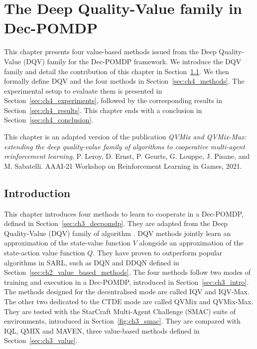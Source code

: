 \chapter{The Deep Quality-Value family in Dec-POMDP}\label{ch:qvmix}
\begin{chapter_outline}

This chapter presents four value-based methods issued from the Deep Quality-Value (DQV) family for the Dec-POMDP framework.
We introduce the DQV family and detail the contribution of this chapter in Section~\ref{sec:ch4_intro}.
We then formally define DQV and the four methods in Section~\ref{sec:ch4_methods}.
The experimental setup to evaluate them is presented in Section~\ref{sec:ch4_experiments}, followed by the corresponding results in Section~\ref{sec:ch4_results}.
This chapter ends with a conclusion in Section~\ref{sec:ch4_conclusion}.

This chapter is an adapted version of the publication \citep{leroy2020qvmix} \textit{QVMix and QVMix-Max: extending the deep quality-value family of algorithms to cooperative multi-agent reinforcement learning}, P. Leroy, D. Ernst, P. Geurts, G. Louppe, J. Pisane, and M. Sabatelli. AAAI-21 Workshop on Reinforcement Learning in Games, 2021.

\end{chapter_outline}


\section{Introduction} \label{sec:ch4_intro}

This chapter introduces four methods to learn to cooperate in a Dec-POMDP, defined in Section~\ref{sec:ch3_decpomdp}.
They are adapted from the Deep Quality-Value (DQV) family of algorithm \citep{sabatelli2020deep}.
DQV methods jointly learn an approximation of the state-value function $V$ alongside an approximation of the state-action value function $Q$.
They have proven to
outperform popular algorithms in SARL, such as DQN and DDQN defined in Section~\ref{sec:ch2_value_based_methods}.
The four methods follow two modes of training and execution in a Dec-POMDP, introduced in Section~\ref{sec:ch3_intro}.
The methods designed for the decentralised mode are called IQV and IQV-Max.
The other two dedicated to the CTDE mode are called QVMix and QVMix-Max.
They are tested with the StarCraft Multi-Agent Challenge (SMAC) suite of environments, introduced in Section~\ref{fig:ch3_smac}.
They are compared with IQL, QMIX and MAVEN, three value-based methods defined in Section~\ref{sec:ch3_value}.

